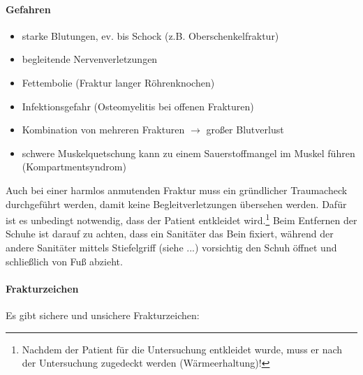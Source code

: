 \paragraph{Gefahren}
\begin{itemize}
    \item starke Blutungen, ev. bis Schock (z.B. Oberschenkelfraktur)
    \item begleitende Nervenverletzungen
    \item Fettembolie (Fraktur langer R\"ohrenknochen)
    \item Infektionsgefahr (Osteomyelitis bei offenen Frakturen)
    \item Kombination von mehreren Frakturen $\rightarrow$ großer Blutverlust
    \item schwere Muskelquetschung kann zu einem Sauerstoffmangel im Muskel führen (Kompartmentsyndrom)
\end{itemize}

Auch bei einer harmlos anmutenden Fraktur muss ein gründlicher Traumacheck durchgeführt werden, damit keine Begleitverletzungen übersehen werden. Dafür ist es unbedingt notwendig, dass der Patient entkleidet wird.\footnote{Nachdem der Patient für die Untersuchung entkleidet wurde, muss er nach der Untersuchung zugedeckt werden (Wärmeerhaltung)!} Beim Entfernen der Schuhe ist darauf zu achten, dass ein Sanitäter das Bein fixiert, während der andere Sanitäter mittels Stiefelgriff (siehe ...) vorsichtig den Schuh öffnet und schließlich von Fuß abzieht.

\paragraph{Frakturzeichen} 

Es gibt sichere und unsichere Frakturzeichen:

